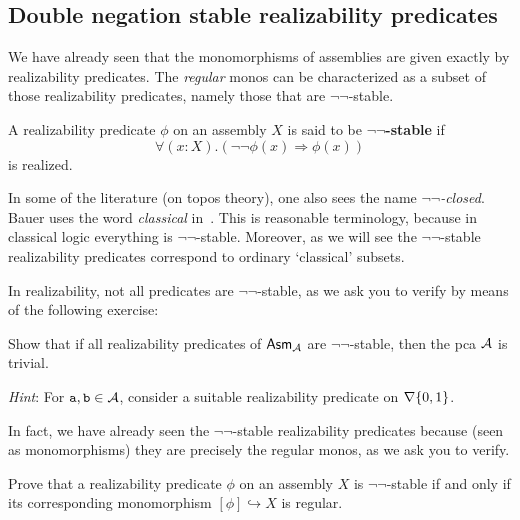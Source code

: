 \subsection{Double negation stable realizability predicates}\label{sec:double-negation-stable}

We have already seen that the monomorphisms of assemblies are given exactly by
realizability predicates. The \emph{regular} monos can be characterized as a
subset of those realizability predicates, namely those that are
\(\lnot\lnot\)-stable.

\begin{definition}
  A realizability predicate \(\phi\) on an assembly \(X\) is said to be
  \textbf{\(\lnot\lnot\)-stable} if
  \[
    \forall(x : X).(\lnot\lnot\phi(x) \Rightarrow \phi(x))
  \]
  is realized.
\end{definition}

In some of the literature (on topos theory), one also sees the name
\emph{\(\lnot\lnot\)-closed}.
%
Bauer uses the word \emph{classical} in~\cite{Bauer2023}.
%
This is reasonable terminology, because in classical logic everything is
\(\lnot\lnot\)-stable. Moreover, as we will see the \(\lnot\lnot\)-stable
realizability predicates correspond to ordinary `classical' subsets.

In realizability, not all predicates are \(\lnot\lnot\)-stable, as we ask you to
verify by means of the following exercise:

\begin{exercise}\label{exer:not-double-negation-stable-predicate}
  Show that if all realizability predicates of \(\Asm{\AA}\) are
  \(\lnot\lnot\)-stable, then the pca \(\AA\) is trivial.

  \emph{Hint}: For \(\pca{a},\pca{b} \in \AA\), consider a suitable
  realizability predicate on \(\nabla\set{0,1}\).
\end{exercise}

In fact, we have already seen the \(\lnot\lnot\)-stable realizability predicates
because (seen as monomorphisms) they are precisely the regular monos, as we ask you
to verify.

\begin{exercise}\label{exer:double-negation-stable-iff-regular-mono}
  Prove that a realizability predicate \(\phi\) on an assembly \(X\) is
  \(\lnot\lnot\)-stable if and only if its corresponding monomorphism
  \([\phi] \hookrightarrow X\) is regular.
\end{exercise}

